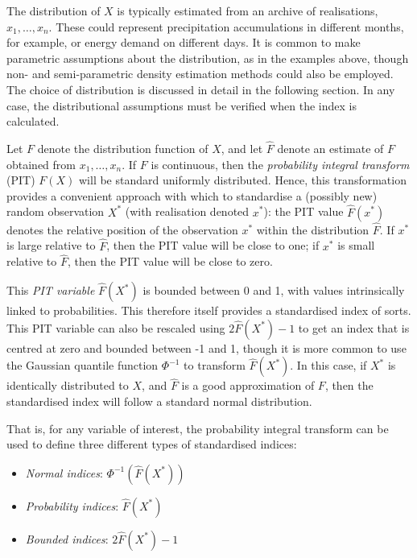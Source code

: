 The distribution of \(X\) is typically estimated from an archive of realisations, \(x_{1}, \dots, x_{n}\). These could represent precipitation accumulations in different months, for example, or energy demand on different days. It is common to make parametric assumptions about the distribution, as in the examples above, though non- and semi-parametric density estimation methods could also be employed. The choice of distribution is discussed in detail in the following section. In any case, the distributional assumptions must be verified when the index is calculated.

Let \(F\) denote the distribution function of \(X\), and let \(\hat{F}\) denote an estimate of \(F\) obtained from \(x_{1}, \dots, x_{n}\). If \(F\) is continuous, then the \emph{probability integral transform} (PIT) \(F(X)\) will be standard uniformly distributed. Hence, this transformation provides a convenient approach with which to standardise a (possibly new) random observation \(X^{*}\) (with realisation denoted \(x^{*}\)): the PIT value \(\hat{F}(x^{*})\) denotes the relative position of the observation \(x^{*}\) within the distribution \(\hat{F}\). If \(x^{*}\) is large relative to \(\hat{F}\), then the PIT value will be close to one; if \(x^{*}\) is small relative to \(\hat{F}\), then the PIT value will be close to zero.

This \emph{PIT variable} \(\hat{F}(X^{*})\) is bounded between 0 and 1, with values intrinsically linked to probabilities. This therefore itself provides a standardised index of sorts. This PIT variable can also be rescaled using \(2\hat{F}(X^{*}) - 1\) to get an index that is centred at zero and bounded between -1 and 1, though it is more common to use the Gaussian quantile function \(\Phi^{-1}\) to transform \(\hat{F}(X^{*})\). In this case, if \(X^{*}\) is identically distributed to \(X\), and \(\hat{F}\) is a good approximation of \(F\), then the standardised index will follow a standard normal distribution.

That is, for any variable of interest, the probability integral transform can be used to define three different types of standardised indices:

\begin{itemize}
\tightlist
\item
  \emph{Normal indices}: \(\Phi^{-1}(\hat{F}(X^{*}))\)
\item
  \emph{Probability indices}: \(\hat{F}(X^{*})\)
\item
  \emph{Bounded indices}: \(2\hat{F}(X^{*}) - 1\)
\end{itemize}

